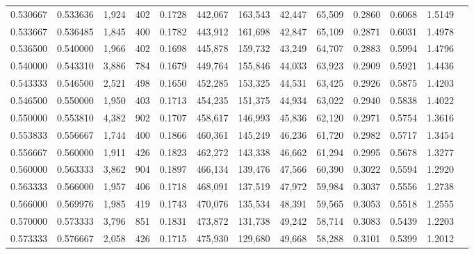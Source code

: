 \begin{tabular}{rrrrrrrrrrrrr}
0.530667 & 0.533636 &  1,924 &   402 &                                     0.1728 & 442,067 & 163,543 &  42,447 &  65,509 & 0.2860 & 0.6068 & 1.5149 \\
0.533667 & 0.536485 &  1,845 &   400 &                                     0.1782 & 443,912 & 161,698 &  42,847 &  65,109 & 0.2871 & 0.6031 & 1.4978 \\
0.536500 & 0.540000 &  1,966 &   402 &                                     0.1698 & 445,878 & 159,732 &  43,249 &  64,707 & 0.2883 & 0.5994 & 1.4796 \\
0.540000 & 0.543310 &  3,886 &   784 &                                     0.1679 & 449,764 & 155,846 &  44,033 &  63,923 & 0.2909 & 0.5921 & 1.4436 \\
0.543333 & 0.546500 &  2,521 &   498 &                                     0.1650 & 452,285 & 153,325 &  44,531 &  63,425 & 0.2926 & 0.5875 & 1.4203 \\
0.546500 & 0.550000 &  1,950 &   403 &                                     0.1713 & 454,235 & 151,375 &  44,934 &  63,022 & 0.2940 & 0.5838 & 1.4022 \\
0.550000 & 0.553810 &  4,382 &   902 &                                     0.1707 & 458,617 & 146,993 &  45,836 &  62,120 & 0.2971 & 0.5754 & 1.3616 \\
0.553833 & 0.556667 &  1,744 &   400 &                                     0.1866 & 460,361 & 145,249 &  46,236 &  61,720 & 0.2982 & 0.5717 & 1.3454 \\
0.556667 & 0.560000 &  1,911 &   426 &                                     0.1823 & 462,272 & 143,338 &  46,662 &  61,294 & 0.2995 & 0.5678 & 1.3277 \\
0.560000 & 0.563333 &  3,862 &   904 &                                     0.1897 & 466,134 & 139,476 &  47,566 &  60,390 & 0.3022 & 0.5594 & 1.2920 \\
0.563333 & 0.566000 &  1,957 &   406 &                                     0.1718 & 468,091 & 137,519 &  47,972 &  59,984 & 0.3037 & 0.5556 & 1.2738 \\
0.566000 & 0.569976 &  1,985 &   419 &                                     0.1743 & 470,076 & 135,534 &  48,391 &  59,565 & 0.3053 & 0.5518 & 1.2555 \\
0.570000 & 0.573333 &  3,796 &   851 &                                     0.1831 & 473,872 & 131,738 &  49,242 &  58,714 & 0.3083 & 0.5439 & 1.2203 \\
0.573333 & 0.576667 &  2,058 &   426 &                                     0.1715 & 475,930 & 129,680 &  49,668 &  58,288 & 0.3101 & 0.5399 & 1.2012 \\

\end{tabular}
